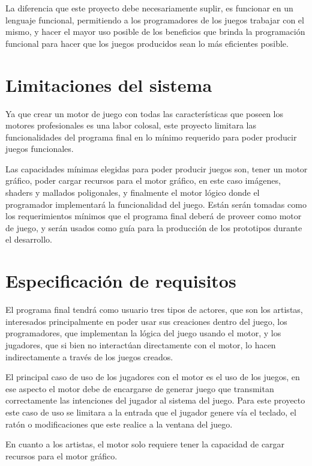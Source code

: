 La diferencia que este proyecto debe necesariamente suplir, es funcionar en un lenguaje funcional, permitiendo a los programadores de los juegos trabajar con el mismo, y hacer el mayor uso posible de los beneficios que brinda la programación funcional para hacer que los juegos producidos sean lo más eficientes posible.

\section{Limitaciones del sistema}

Ya que crear un motor de juego con todas las características que poseen los motores profesionales es una labor colosal, este proyecto limitara las funcionalidades del programa final en lo mínimo requerido para poder producir juegos funcionales.

Las capacidades mínimas elegidas para poder producir juegos son, tener un  motor gráfico, poder cargar recursos para el motor gráfico, en este caso imágenes, shaders y mallados poligonales, y finalmente el motor lógico donde el programador implementará la funcionalidad del juego. Están serán tomadas como los requerimientos  mínimos que el programa final deberá de proveer como motor de juego, y serán usados como guía para la producción de los prototipos durante el desarrollo.

\section{Especificación de requisitos}

El programa final tendrá como usuario tres tipos de actores, que son los artistas, interesados principalmente en poder usar sus creaciones dentro del juego, los programadores, que implementan la lógica del juego usando el motor, y los jugadores, que si bien no interactúan directamente con el motor, lo hacen indirectamente a través de los juegos creados.

El principal caso de uso de los jugadores con el motor es el uso de los juegos, en ese aspecto el motor debe de encargarse de generar juego que transmitan correctamente las intenciones del jugador al sistema del juego. Para este proyecto este caso de uso se limitara a la entrada que el jugador genere vía el teclado, el ratón o modificaciones que este realice a la ventana del juego.

En cuanto a los artistas, el motor solo requiere tener la capacidad de cargar recursos para el motor gráfico.

